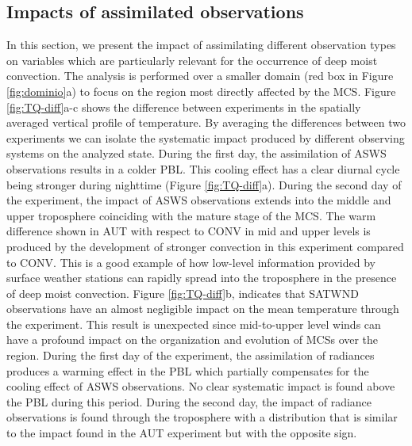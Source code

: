 \documentclass[final,5p,times,twocolumn,authoryear]{elsarticle} %
\begin{document}
\hypertarget{impacts-of-assimilated-observations}{%
\subsection{Impacts of assimilated observations}\label{impacts-of-assimilated-observations}}

In this section, we present the impact of assimilating different observation types on variables which are particularly relevant for the occurrence of deep moist convection. The analysis is performed over a smaller domain (red box in Figure \ref{fig:dominio}a) to focus on the region most directly affected by the MCS. Figure \ref{fig:TQ-diff}a-c shows the difference between experiments in the spatially averaged vertical profile of temperature. By averaging the differences between two experiments we can isolate the systematic impact produced by different observing systems on the analyzed state. During the first day, the assimilation of ASWS observations results in a colder PBL. This cooling effect has a clear diurnal cycle being stronger during nighttime (Figure \ref{fig:TQ-diff}a). During the second day of the experiment, the impact of ASWS observations extends into the middle and upper troposphere coinciding with the mature stage of the MCS. The warm difference shown in AUT with respect to CONV in mid and upper levels is produced by the development of stronger convection in this experiment compared to CONV. This is a good example of how low-level information provided by surface weather stations can rapidly spread into the troposphere in the presence of deep moist convection. Figure \ref{fig:TQ-diff}b, indicates that SATWND observations have an almost negligible impact on the mean temperature through the experiment. This result is unexpected since mid-to-upper level winds can have a profound impact on the organization and evolution of MCSs over the region.
During the first day of the experiment, the assimilation of radiances produces a warming effect in the PBL which partially compensates for the cooling effect of ASWS observations. No clear systematic impact is found above the PBL during this period. During the second day, the impact of radiance observations is found through the troposphere with a distribution that is similar to the impact found in the AUT experiment but with the opposite sign.
\end{document}
